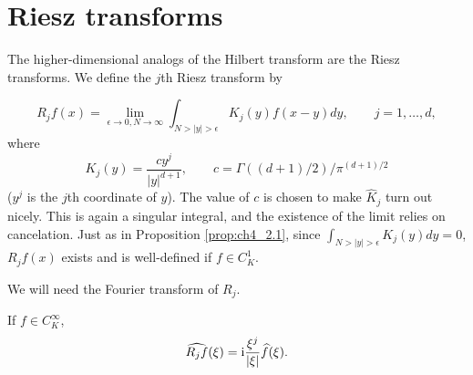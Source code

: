 \section{Riesz transforms}\label{ch4_sec3}


The higher-dimensional analogs of the Hilbert transform are the Riesz transforms. We define the $j$th Riesz transform by

\begin{equation}\label{eq:ch4_3.1}
R_j f(x) = \lim_{\epsilon\to 0,N\to\infty} \int_{N>|y|>\epsilon} K_j(y)f(x-y)dy, \qquad j=1,\ldots,d,
\end{equation}
where
\begin{equation}\label{eq:ch4_3.2}
    K_j(y) = \frac{cy^j}{|y|^{d+1}}, \qquad c = \Gamma((d+1)/2)/\pi^{(d+1)/2}
\end{equation}
($y^j$ is the $j$th coordinate of $y$). The value of $c$ is chosen to make $\widehat{K}_j$ turn out nicely. This is again a singular integral, and the existence of the limit relies on cancelation. Just as in Proposition \ref{prop:ch4_2.1}, since $\int_{N>|y|>\epsilon} K_j(y)dy = 0$, $R_j f(x)$ exists and is well-defined if $f \in C_K^1$.


We will need the Fourier transform of $R_j$.

\begin{proposition}\label{prop:ch4_3.1}
If $f \in C_K^\infty$,
\[
    \widehat{R_j f}(\xi) = \mathrm{i}\frac{\xi^j}{|\xi|}\widehat{f}(\xi).
\]
\end{proposition}

